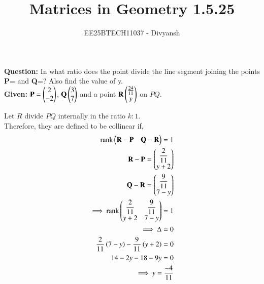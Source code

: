 \documentclass[journal,12pt,onecolumn]{IEEEtran}
\title{Matrices in Geometry 1.5.25}
\author{EE25BTECH11037 - Divyansh}
\theoremstyle{remark}
\begin{document}
\vspace{3cm}
\maketitle
{\let\newpage\relax\maketitle}
\textbf{Question: }
In what ratio does the point  divide the line segment joining the points \textbf{P}= and \textbf{Q}=? Also find the value of y.\\

\textbf{Given: } 
$\mathbf{P}=\begin{pmatrix}2\\-2\end{pmatrix}$, $\mathbf{Q}\begin{pmatrix}3\\7\end{pmatrix}$ and a point $\mathbf{R} \begin{pmatrix}\frac{24}{11} \\ y\end{pmatrix}$ on $PQ$.

Let $R$ divide $PQ$ internally in the ratio $k:1$.\\
Therefore, they are defined to be collinear if,
\begin{align*}
    \text{rank}\begin{pmatrix}\mathbf{R}- \mathbf{P} & \mathbf{Q}-\mathbf{R}\end{pmatrix}=1\\
    \mathbf{R}-\mathbf{P}=\begin{pmatrix}\dfrac{2}{11} \\ y+2\end{pmatrix}\\
    \mathbf{Q}-\mathbf{R}=\begin{pmatrix}\dfrac{9}{11} \\ 7-y\end{pmatrix}\\
    \implies \text{rank}\begin{pmatrix}\dfrac{2}{11} & \dfrac{9}{11} \\ y+2 & 7-y\end{pmatrix} = 1\\
    \implies \Delta=0\\
    \dfrac{2}{11}\left(7-y\right) - \dfrac{9}{11}\left(y+2\right)=0\\
    14-2y-18-9y=0\\
    \implies y=\dfrac{-4}{11}
\end{align*}
\end{document}
